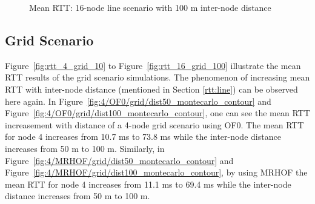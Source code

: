 \begin{figure}[p]
  \centering
    \leavevmode
  \caption{Mean RTT: 16-node line scenario with 100 m inter-node distance}
 \label{fig:rtt_16_line_100}
\end{figure}


\clearpage
\subsection{Grid Scenario}
\label{rtt:grid}

Figure~\ref{fig:rtt_4_grid_10} to Figure~\ref{fig:rtt_16_grid_100} illustrate the mean RTT results of the grid scenario simulations. The phenomenon of increasing mean RTT with inter-node distance (mentioned in Section \ref{rtt:line}) can be observed here again. In Figure~\ref{fig:4/OF0/grid/dist50_montecarlo_contour} and Figure~\ref{fig:4/OF0/grid/dist100_montecarlo_contour}, one can see the mean RTT increasement with distance of a 4-node grid scenario using OF0. The mean RTT for node 4 increases from  10.7 ms to 73.8 ms while the inter-node distance increases from 50 m to 100 m. Similarly, in Figure~\ref{fig:4/MRHOF/grid/dist50_montecarlo_contour} and Figure~\ref{fig:4/MRHOF/grid/dist100_montecarlo_contour}, by using MRHOF the mean RTT for node 4 increases from  11.1 ms to 69.4 ms while the inter-node distance increases from 50 m to 100 m.

